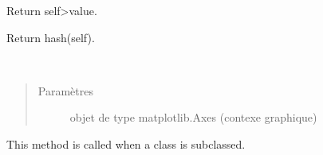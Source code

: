 \documentclass[a4paper,10pt,french]{sphinxmanual}
\begin{document}
\begin{fulllineitems}
\begin{fulllineitems}
\label{\detokenize{road_objects/graphical_item:road_objects.graphical_item.GraphicalItem.__getitem__}}
\end{fulllineitems}


\begin{fulllineitems}
\label{\detokenize{road_objects/graphical_item:road_objects.graphical_item.GraphicalItem.__gt__}}
Return self\textgreater{}value.

\end{fulllineitems}


\begin{fulllineitems}
\label{\detokenize{road_objects/graphical_item:road_objects.graphical_item.GraphicalItem.__hash__}}
Return hash(self).

\end{fulllineitems}


\begin{fulllineitems}
\label{\detokenize{road_objects/graphical_item:road_objects.graphical_item.GraphicalItem.__init__}}~\begin{quote}\begin{description}
\item[{Paramètres}] \leavevmode
{} \textendash{} objet de type matplotlib.Axes (contexe graphique)

\end{description}\end{quote}

\end{fulllineitems}


\begin{fulllineitems}
\label{\detokenize{road_objects/graphical_item:road_objects.graphical_item.GraphicalItem.__init_subclass__}}
This method is called when a class is subclassed.


\end{fulllineitems}
\end{fulllineitems}
\end{document}
